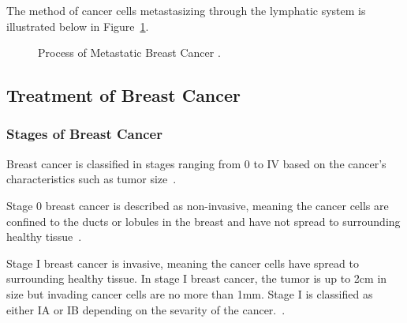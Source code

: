 The method of cancer cells metastasizing through the lymphatic system is illustrated below in Figure~\ref{fig:introduction:process_of_metastatic_breast_cancer}.

\begin{figure}[h!]
        \centering
        \caption{Process of Metastatic Breast Cancer \cite{RefWorks:RefID:364-riggio2020lingering}.}
        \label{fig:introduction:process_of_metastatic_breast_cancer}
\end{figure}

\subsection{Treatment of Breast Cancer\label{sec:introduction:treatmentofbreastcancer}}

\subsubsection{Stages of Breast Cancer\label{sec:introduction:breastcancer:stagesofbreastcancer}}
Breast cancer is classified in stages ranging from 0 to IV based on the cancer's characteristics such as tumor size~\cite{RefWorks:RefID:151-2025breast}.

Stage 0 breast cancer is described as non-invasive, meaning the cancer cells are confined to the ducts or lobules in the breast and have not spread to surrounding healthy tissue~\cite{RefWorks:RefID:151-2025breast}.

Stage I breast cancer is invasive, meaning the cancer cells have spread to surrounding healthy tissue. In stage I breast cancer, the tumor is up to 2cm in size but invading cancer cells are no more than 1mm. Stage I is classified as either IA or IB depending on the sevarity of the cancer.~\cite{RefWorks:RefID:151-2025breast}.

